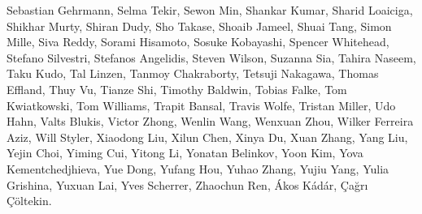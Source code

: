 \begin{addmargin}[0.2in]{0em}
Sebastian Gehrmann, Selma Tekir, Sewon Min, Shankar Kumar, Sharid Loaiciga, Shikhar Murty, Shiran Dudy, Sho Takase, Shoaib Jameel, Shuai Tang, Simon Mille, Siva Reddy, Sorami Hisamoto, Sosuke Kobayashi, Spencer Whitehead, Stefano Silvestri, Stefanos Angelidis, Steven Wilson, Suzanna Sia, Tahira Naseem, Taku Kudo, Tal Linzen, Tanmoy Chakraborty, Tetsuji Nakagawa, Thomas Effland, Thuy Vu, Tianze Shi, Timothy Baldwin, Tobias Falke, Tom Kwiatkowski, Tom Williams, Trapit Bansal, Travis Wolfe, Tristan Miller, Udo Hahn, Valts Blukis, Victor Zhong, Wenlin Wang, Wenxuan Zhou, Wilker Ferreira Aziz, Will Styler, Xiaodong Liu, Xilun Chen, Xinya Du, Xuan Zhang, Yang Liu, Yejin Choi, Yiming Cui, Yitong Li, Yonatan Belinkov, Yoon Kim, Yova Kementchedjhieva, Yue Dong, Yufang Hou, Yuhao Zhang, Yujiu Yang, Yulia Grishina, Yuxuan Lai, Yves Scherrer, Zhaochun Ren, Ákos Kádár, Çağrı Çöltekin.
    \end{addmargin}
